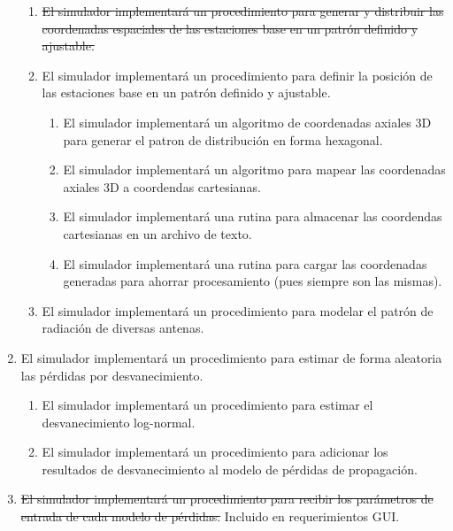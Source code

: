 \begin{enumerate}
\begin{enumerate}
                            \item \sout{El simulador implementará un procedimiento para generar y distribuir las coordenadas espaciales de las estaciones base en un patrón definido y ajustable.}
                            \item El simulador implementará un procedimiento para definir la posición de las estaciones base en un patrón definido y ajustable.
                                \begin{enumerate}            
                                    \item El simulador implementará un algoritmo de coordenadas axiales  3D para generar el patron de distribución en forma hexagonal.
                                    \item El simulador implementará un algoritmo para mapear las coordenadas axiales 3D a coordendas cartesianas.
                                    \item El simulador implementará una rutina para almacenar las coordendas cartesianas en un archivo de texto.
                                    \item El simulador implementará una rutina para cargar las coordenadas generadas para ahorrar procesamiento (pues siempre son las mismas).
                                \end{enumerate}
                            \item El simulador implementará un procedimiento para modelar el patrón de radiación de diversas antenas.
                        \end{enumerate}
            
            
                        
            \item El simulador implementará un procedimiento para estimar de forma aleatoria las pérdidas por desvanecimiento.
                \begin{enumerate}
                    \item El simulador implementará un procedimiento para estimar el desvanecimiento log-normal.            
                    \item El simulador implementará un procedimiento para adicionar los resultados de desvanecimiento al modelo de pérdidas de propagación.
                \end{enumerate}
            
            \item \sout{El simulador implementará un procedimiento para recibir los parámetros de entrada de cada modelo de pérdidas.} Incluido en requerimientos GUI.
            

\end{enumerate}
